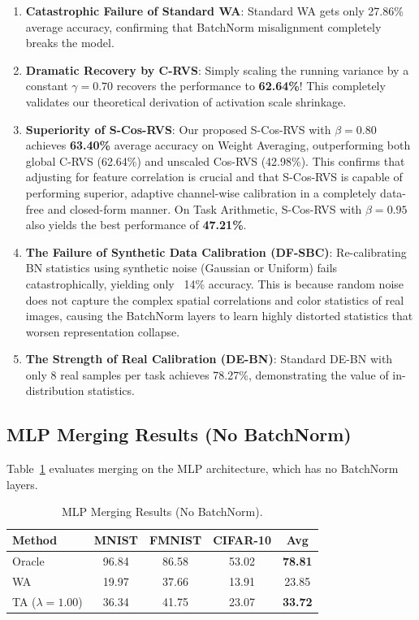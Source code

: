 \documentclass{article}
\theoremstyle{plain}
\theoremstyle{definition}
\theoremstyle{remark}
\begin{document}
\begin{enumerate}
    \item \textbf{Catastrophic Failure of Standard WA}: Standard WA gets only 27.86\% average accuracy, confirming that BatchNorm misalignment completely breaks the model.
    \item \textbf{Dramatic Recovery by C-RVS}: Simply scaling the running variance by a constant $\gamma=0.70$ recovers the performance to \textbf{62.64\%}! This completely validates our theoretical derivation of activation scale shrinkage.
    \item \textbf{Superiority of S-Cos-RVS}: Our proposed S-Cos-RVS with $\beta=0.80$ achieves \textbf{63.40\%} average accuracy on Weight Averaging, outperforming both global C-RVS (62.64\%) and unscaled Cos-RVS (42.98\%). This confirms that adjusting for feature correlation is crucial and that S-Cos-RVS is capable of performing superior, adaptive channel-wise calibration in a completely data-free and closed-form manner. On Task Arithmetic, S-Cos-RVS with $\beta=0.95$ also yields the best performance of \textbf{47.21\%}.
    \item \textbf{The Failure of Synthetic Data Calibration (DF-SBC)}: Re-calibrating BN statistics using synthetic noise (Gaussian or Uniform) fails catastrophically, yielding only ~14\% accuracy. This is because random noise does not capture the complex spatial correlations and color statistics of real images, causing the BatchNorm layers to learn highly distorted statistics that worsen representation collapse.
    \item \textbf{The Strength of Real Calibration (DE-BN)}: Standard DE-BN with only 8 real samples per task achieves 78.27\%, demonstrating the value of in-distribution statistics.
\end{enumerate}

\subsection{MLP Merging Results (No BatchNorm)}

Table~\ref{tab:mlp_results} evaluates merging on the MLP architecture, which has no BatchNorm layers. 

\begin{table}[h]
\caption{MLP Merging Results (No BatchNorm).}
\label{tab:mlp_results}
\begin{center}
\begin{small}
\begin{sc}
\setlength{\tabcolsep}{4pt}
\begin{tabular}{lcccc}
\toprule
Method & MNIST & FMNIST & CIFAR-10 & Avg \\
\midrule
Oracle & 96.84 & 86.58 & 53.02 & \textbf{78.81} \\
WA & 19.97 & 37.66 & 13.91 & 23.85 \\
TA ($\lambda=1.00$) & 36.34 & 41.75 & 23.07 & \textbf{33.72} \\
\bottomrule
\end{tabular}
\end{sc}
\end{small}
\end{center}
\end{table}
\end{document}
